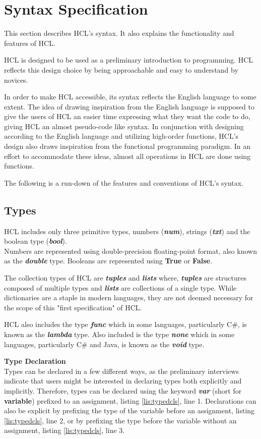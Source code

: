 \section{Syntax Specification}
This section describes HCL's syntax.
It also explains the functionality and features of HCL.

HCL is designed to be used as a preliminary introduction to programming.
HCL reflects this design choice by being approachable and easy to understand by novices.

In order to make HCL accessible, its syntax reflects the English language to some extent.
The idea of drawing inspiration from the English language is supposed to give the users of HCL an easier time expressing what they want the code to do, giving HCL an almost pseudo-code like syntax.
In conjunction with designing according to the English language and utilizing high-order functions, HCL's design also draws inspiration from the functional programming paradigm.
In an effort to accommodate these ideas, almost all operations in HCL are done using functions. 

The following is a run-down of the features and conventions of HCL's syntax.

\subsection{Types}
HCL includes only three primitive types, numbers (\textbf{\textit{num}}), strings (\textbf{\textit{txt}}) and the boolean type (\textbf{\textit{bool}}).\\
Numbers are represented using double-precision floating-point format, also known as the \textbf{\textit{double}} type.
Booleans are represented using \textbf{True} or \textbf{False}.

The collection types of HCL are \textbf{\textit{tuples}} and \textbf{\textit{lists}} where, 
\textbf{\textit{tuples}} are structures composed of multiple types and \textbf{\textit{lists}} are collections of a single type.
While dictionaries are a staple in modern languages, they are not deemed necessary for the scope of this "first specification" of HCL.

HCL also includes the type \textbf{\textit{func}} which in some languages, particularly C\#, is known as the \textbf{\textit{lambda}} type.
Also included is the type \textbf{\textit{none}} which in some languages, particularly C\# and Java, is known as the \textbf{\textit{void}} type. 

\textbf{Type Declaration}\\
Types can be declared in a few different ways, as the preliminary interviews indicate that users might be interested in declaring types both explicitly and implicitly.
Therefore, types can be declared using the keyword \textbf{\textit{var}} (short for \textbf{variable\textit{}}) prefixed to an assignment, listing \ref{lis:typedcls}, line 1.
Declarations can also be explicit by prefixing the type of the variable before an assignment, listing \ref{lis:typedcls}, line 2, or by prefixing the type before the variable without an assignment, listing \ref{lis:typedcls}, line 3.

